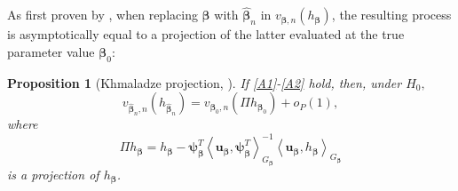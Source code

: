 \documentclass[11pt]{article}
\newcommand{\vect}[1]{\boldsymbol{#1}}
\newcommand{\inner}[1]{\left\langle #1 \right\rangle}
\begin{document}
As first proven by \cite{K2}, when replacing $\vect{\beta}$ with $\widehat{\vect{\beta}}_n$ in $v_{{\vect{\beta}},n}(h_{{\vect{\beta}}})$, the resulting process is asymptotically equal to a projection of the latter evaluated at the true parameter value $\vect{\beta}_0$:
\newtheorem{prop}{Proposition}
\begin{prop}[Khmaladze projection, \citet{K2}]
\label{prop:process_equiv}
If \ref{A1}-\ref{A2} hold, then, under $H_0,$
\begin{equation}
v_{\widehat{\vect{\beta}}_n,n}(h_{\widehat{\vect{\beta}}_n}) = v_{\vect{\beta}_0,n}( \Pi h_{\vect{\beta}_0}) + o_P(1), 
\label{eqn:process_equiv}
\end{equation}
where 
\begin{equation}
\label{eqn:pi}
    \Pi h_{\vect{\beta}} = h_{\vect{\beta}} -\vect{\psi}_{\vect{\beta}}^T\inner{\vect{u}_{\vect{\beta}},\vect{\psi}^T_{\vect{\beta}}}^{-1}_{G_{\vect{\beta}}}\inner{\vect{u}_{\vect{\beta}},h_{\vect{\beta}}}_{G_{\vect{\beta}}}
\end{equation}
is a projection of $h_{\vect{\beta}}$.
\end{prop}
\end{document}
